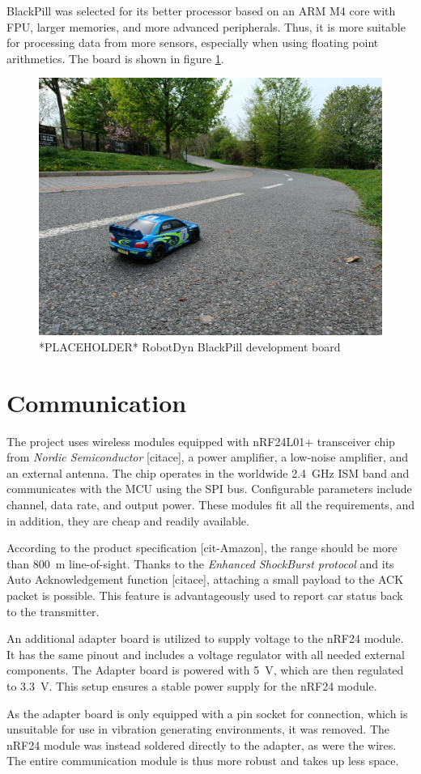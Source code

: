 BlackPill was selected for its better processor based on an ARM M4 core with FPU, larger memories, and more advanced peripherals. Thus, it is more suitable for processing data from more sensors, especially when using floating point arithmetics. The board is shown in figure \ref{fig:black_pill}.
\begin{figure}[t]
\centering
\includegraphics[width=0.5\linewidth]{fig/placeholder.jpg}
\caption{*PLACEHOLDER* RobotDyn BlackPill development board}
\label{fig:black_pill}
\end{figure}


\section{Communication}
\label{sec:hw_comm}
The project uses wireless modules equipped with nRF24L01+ transceiver chip from \textit{Nordic Semiconductor} [\todo citace], a power amplifier, a low-noise amplifier, and an external antenna. The chip operates in the worldwide \SI{2.4}{\GHz} ISM band and communicates with the MCU using the SPI bus. Configurable parameters include channel, data rate, and output power. These modules fit all the requirements, and in addition, they are cheap and readily available.

According to the product specification [\todo cit-Amazon], the range should be more than \SI{800}{\m} line-of-sight. Thanks to the \textit{Enhanced ShockBurst protocol} and its Auto Acknowledgement function [\todo citace], attaching a small payload to the ACK packet is possible. This feature is advantageously used to report car status back to the transmitter.

An additional adapter board is utilized to supply voltage to the nRF24 module. It has the same pinout and includes a voltage regulator with all needed external components. The Adapter board is powered with \SI{5}{\V}, which are then regulated to \SI{3.3}{\V}. This setup ensures a stable power supply for the nRF24 module.

As the adapter board is only equipped with a pin socket for connection, which is unsuitable for use in vibration generating environments, it was removed. The nRF24 module was instead soldered directly to the adapter, as were the wires. The entire communication module is thus more robust and takes up less space.


